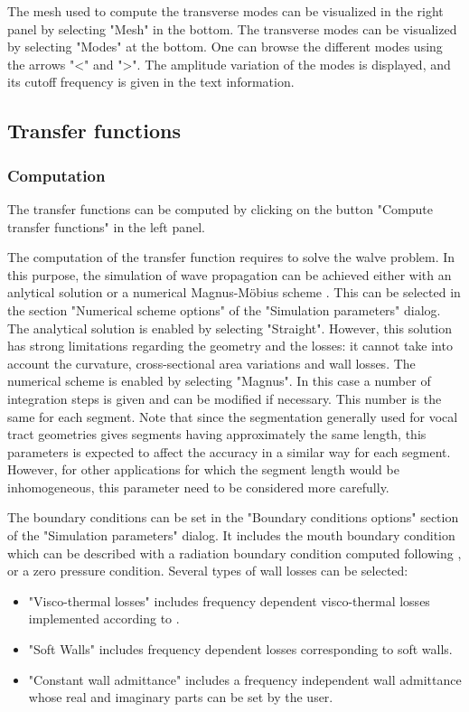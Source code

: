 \documentclass[]{article}
\begin{document}
	The mesh used to compute the transverse modes can be visualized
	in the right panel by selecting "Mesh" in the bottom.
	The transverse modes can be visualized by 
	selecting "Modes" at the bottom. 
	One can browse the different modes using the arrows "<" and ">".
	The amplitude variation of the modes is displayed, and its cutoff 
	frequency is given in the text information.
	
	\subsection{Transfer functions}
	
	\subsubsection{Computation}
	
	The transfer functions can be computed by clicking on the button 
	"Compute transfer functions" in the left panel.
	
	The computation of the transfer function requires to solve the 
	walve problem. In this purpose, the simulation of wave propagation can be achieved either with an anlytical 
	solution \cite{blandin2015effects} or a numerical Magnus-Möbius 
	scheme \cite{PAGNEUX20101834}.
	This can be selected in the section "Numerical scheme options" of
	the "Simulation parameters" dialog. The analytical solution is 
	enabled by selecting "Straight". However, this solution has strong limitations regarding the geometry and the losses: it cannot take into account the curvature, cross-sectional area variations and 
	wall losses. The numerical scheme is enabled by selecting "Magnus".
	In this case a number of integration steps is given and can be 
	modified if necessary. This number is the same for each segment.
	Note that since the segmentation generally used for vocal tract geometries gives segments having approximately the same length, 
	this parameters is expected to affect the accuracy in a similar way
	for each segment. However, for other applications for which the 
	segment length would be inhomogeneous, this parameter need to be considered more carefully.
	
	The boundary conditions can be set in the "Boundary conditions options" section of the "Simulation parameters" dialog. 
	It includes the mouth boundary condition which can be described
	with a radiation boundary condition computed following 
	\textcite{blandin2019multimodal},
	or a zero pressure condition.
	Several types of wall losses can be selected: 
	\begin{itemize}
		\item "Visco-thermal losses" includes frequency dependent 
		visco-thermal losses implemented according to 
		\textcite{bruneau1987boundary}.
		\item "Soft Walls" includes frequency dependent losses 
		corresponding to soft walls.
		\item "Constant wall admittance" includes a frequency
		independent wall admittance whose real and imaginary parts 
		can be set by the user.
	\end{itemize}
\end{document}
